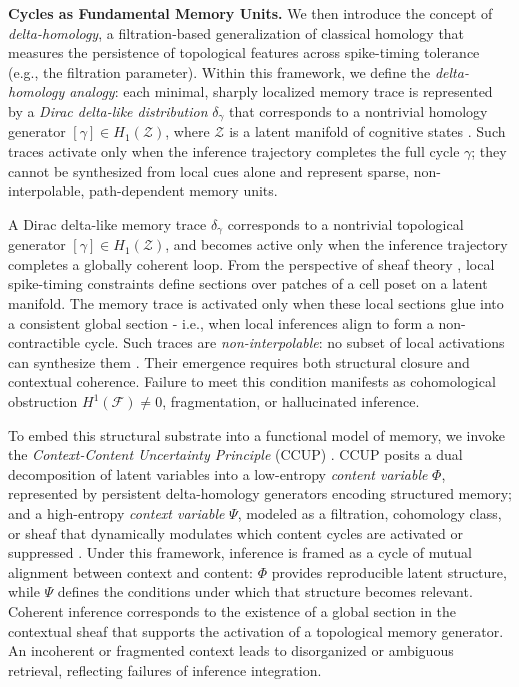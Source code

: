 \documentclass[lettersize,journal]{IEEEtran}
\begin{document}
\noindent\textbf{Cycles as Fundamental Memory Units.} We then introduce the concept of \emph{delta-homology}, a filtration-based generalization of classical homology that measures the persistence of topological features across spike-timing tolerance (e.g., the filtration parameter). Within this framework, we define the \emph{delta-homology analogy}: each minimal, sharply localized memory trace is represented by a \emph{Dirac delta-like distribution} \( \delta_\gamma \) \cite{richards1995theory} that corresponds to a nontrivial homology generator \( [\gamma] \in H_1(\mathcal{Z}) \), where \( \mathcal{Z} \) is a latent manifold of cognitive states \cite{hatcher2005algebraic}. Such traces activate only when the inference trajectory completes the full cycle \( \gamma \); they cannot be synthesized from local cues alone and represent sparse, non-interpolable, path-dependent memory units.

A Dirac delta-like memory trace \( \delta_\gamma \) corresponds to a nontrivial topological generator \( [\gamma] \in H_1(\mathcal{Z}) \), and becomes active only when the inference trajectory completes a globally coherent loop. From the perspective of sheaf theory \cite{bredon1997sheaf}, local spike-timing constraints define sections over patches of a cell poset on a latent manifold. The memory trace is activated only when these local sections glue into a consistent global section - i.e., when local inferences align to form a non-contractible cycle. Such traces are \emph{non-interpolable}: no subset of local activations can synthesize them \cite{abramsky2011sheaf}. Their emergence requires both structural closure and contextual coherence. Failure to meet this condition manifests as cohomological obstruction \( H^1(\mathcal{F}) \ne 0 \), fragmentation, or hallucinated inference.


To embed this structural substrate into a functional model of memory, we invoke the \emph{Context-Content Uncertainty Principle} (CCUP) \cite{li2025CCUP}. CCUP posits a dual decomposition of latent variables into a low-entropy \emph{content variable} \( \Phi \), represented by persistent delta-homology generators encoding structured memory;
and a high-entropy \emph{context variable} \( \Psi \), modeled as a filtration, cohomology class, or sheaf that dynamically modulates which content cycles are activated or suppressed \cite{bredon1997sheaf}.
Under this framework, inference is framed as a cycle of mutual alignment between context and content: \( \Phi \) provides reproducible latent structure, while \( \Psi \) defines the conditions under which that structure becomes relevant. Coherent inference corresponds to the existence of a global section in the contextual sheaf that supports the activation of a topological memory generator\cite{sizemore2019importance}. An incoherent or fragmented context leads to disorganized or ambiguous retrieval, reflecting failures of inference integration.
\end{document}
